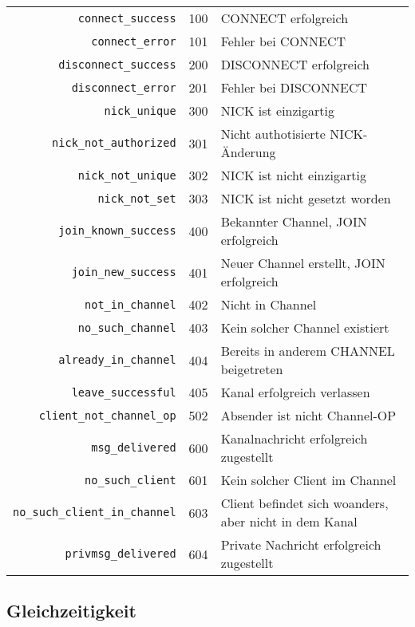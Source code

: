 \documentclass{article}
\begin{document}
\begin{tabular}{rl}

  \lstinline{connect_success}           & 100 & CONNECT erfolgreich \\
  \lstinline{connect_error}             & 101 & Fehler bei CONNECT \\
  \lstinline{disconnect_success}        & 200 & DISCONNECT erfolgreich \\
  \lstinline{disconnect_error}          & 201 & Fehler bei DISCONNECT \\
  \lstinline{nick_unique}               & 300 & NICK ist einzigartig \\
  \lstinline{nick_not_authorized}       & 301 & Nicht authotisierte NICK-Änderung \\
  \lstinline{nick_not_unique}           & 302 & NICK ist nicht einzigartig \\
  \lstinline{nick_not_set}              & 303 & NICK ist nicht gesetzt worden \\
  \lstinline{join_known_success}        & 400 & Bekannter Channel, JOIN erfolgreich \\
  \lstinline{join_new_success}          & 401 & Neuer Channel erstellt, JOIN erfolgreich \\
  \lstinline{not_in_channel}            & 402 & Nicht in Channel \\
  \lstinline{no_such_channel}           & 403 & Kein solcher Channel existiert \\
  \lstinline{already_in_channel}        & 404 & Bereits in anderem CHANNEL beigetreten \\
  \lstinline{leave_successful}          & 405 & Kanal erfolgreich verlassen \\
  \lstinline{client_not_channel_op}     & 502 & Absender ist nicht Channel-OP \\
  \lstinline{msg_delivered}             & 600 & Kanalnachricht erfolgreich zugestellt \\
  \lstinline{no_such_client}            & 601 & Kein solcher Client im Channel \\
  \lstinline{no_such_client_in_channel} & 603 & Client befindet sich woanders, aber nicht in dem Kanal \\
  \lstinline{privmsg_delivered}         & 604 & Private Nachricht erfolgreich zugestellt \\
\end{tabular}

\subsection{Gleichzeitigkeit}
\end{document}
